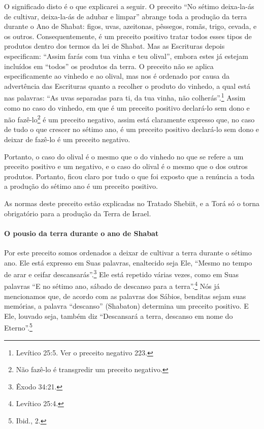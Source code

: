 O significado disto é o que explicarei a seguir. O preceito ``No sétimo
deixa-la-ás de cultivar, deixa-la-ás de adubar e limpar'' abrange toda a
produção da terra durante o Ano de Shabat: figos, uvas, azeitonas,
pêssegos, romãs, trigo, cevada, e os outros. Consequentemente, é um
preceito positivo tratar todos esses tipos de produtos dentro dos
termos da lei de Shabat. Mas as Escrituras depois especificam: ``Assim
farás com tua vinha e teu olival'', embora estes já estejam incluídos
em ``todos'' os produtos da terra. O preceito não se aplica
especificamente ao vinhedo e ao olival, mas nos é ordenado por causa
da advertência das Escrituras quanto a recolher o produto do vinhedo, a
qual está nas palavras: ``As uvas separadas para ti, da tua vinha, não
colherás''.\footnote{Levítico 25:5. Ver o preceito negativo 223.} Assim como no caso do vinhedo, em que é
um preceito positivo declará-lo sem dono e não
fazê-lo\footnote{Não fazê-lo é transgredir um preceito negativo.} é um preceito negativo, assim está claramente expresso que, no caso de tudo o que crescer no sétimo ano, é um preceito positivo declará-lo sem dono e deixar de fazê-lo é um preceito negativo.

Portanto, o caso do olival é o mesmo que o do vinhedo no que se refere a
um preceito positivo e um negativo, e o caso do olival é o mesmo que o
dos outros produtos. Portanto, ficou claro por tudo o que foi exposto
que a renúncia a toda a produção do sétimo ano é um preceito positivo.

As normas deste preceito estão explicadas no Tratado Shebiit, e a Torá
só o torna obrigatório para a produção da Terra de Israel.

\paragraph{O pousio da terra durante o ano de Shabat}

Por este preceito somos ordenados a deixar de cultivar a terra durante
o sétimo ano. Ele está expresso em Suas palavras, enaltecido seja Ele,
``Mesmo no tempo de arar e ceifar descansarás''.\footnote{Êxodo 34:21.} Ele está
repetido várias vezes, como em Suas palavras ``E no sétimo ano, sábado
de descanso para a terra''.\footnote{Levítico 25:4.} Nós já mencionamos que, de
acordo com as palavras dos Sábios, benditas sejam suas memórias, a
palavra ``descanso'' (Shabaton) determina um preceito positivo. E Ele,
louvado seja, também diz ``Descansará a terra, descanso em nome do
Eterno''.\footnote{Ibid., 2.}

